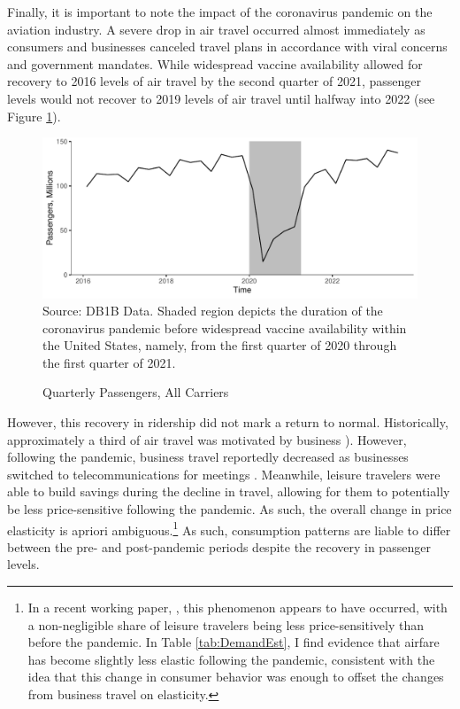 \documentclass{article}
\begin{document}
	
	Finally, it is important to note the impact of the coronavirus pandemic on the aviation industry.  A severe drop in air travel occurred almost immediately as consumers and businesses canceled travel plans in accordance with viral concerns and government mandates. While widespread vaccine availability allowed for recovery to 2016 levels of air travel by the second quarter of 2021, passenger levels would not recover to 2019 levels of air travel until halfway into 2022 (see Figure \ref{fig:QuarterlyPass}). 

\begin{figure}
	\caption{Quarterly Passengers, All Carriers}
	\label{fig:QuarterlyPass}
	\includegraphics[width = \linewidth]{Quarterly_DB1B_Itineraries}
	\footnotesize{Source: DB1B Data. Shaded region depicts the duration of the coronavirus pandemic before widespread vaccine availability within the United States, namely, from the first quarter of 2020 through the first quarter of 2021.}
\end{figure}
    
	However, this recovery in ridership did not mark a return to normal. Historically, approximately a third of air travel was motivated by business \citep{berry_tracing_2010, bet_market_2021}). However, following the pandemic, business travel reportedly decreased as businesses switched to telecommunications for meetings \citep{semuels_business_2021}. Meanwhile, leisure travelers were able to build savings during the decline in travel, allowing for them to potentially be less price-sensitive following the pandemic. As such, the overall change in price elasticity is apriori ambiguous.\footnote{In a recent working paper, \citet{ewen_zoom_2023}, this phenomenon appears to have occurred, with a non-negligible share of leisure travelers being less price-sensitively than before the pandemic. In Table \ref{tab:DemandEst}, I find evidence that airfare has become slightly less elastic following the pandemic, consistent with the idea that this change in consumer behavior was enough to offset the changes from business travel on elasticity.}  As such, consumption patterns are liable to differ between the pre- and post-pandemic periods despite the recovery in passenger levels. 
	
\end{document}
